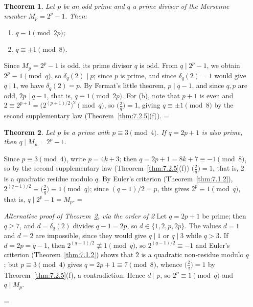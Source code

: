 \documentclass[11pt]{article}
\makeatletter
\let\nt@closedisplay\]
\def\nt@guardedclose{\@ifnextchar\par{\nt@closeafterpar}{\@ifnextchar\end{\postdisplaypenalty\@M\nt@closedisplay}{\nt@closedisplay}}}
\def\nt@closeafterpar\par{\@ifnextchar\par{\nt@closeafterpar}{\@ifnextchar\end{\postdisplaypenalty\@M\nt@closedisplay\par}{\nt@closedisplay\par}}}
\renewenvironment{proof}[1][\proofname]{\par
  \pushQED{\qed}\normalfont\topsep\medskipamount\edef\nt@afterproof{\@endparpenalty=\the\@endparpenalty\relax}\@beginparpenalty\@M\@endparpenalty\@M\let\]\nt@guardedclose\trivlist\item[]\textit{#1\@addpunct{.}} \ignorespaces}{\ifvmode\addpenalty\@M\fi\popQED\nt@afterproof\endtrivlist\@endpefalse}
\theoremstyle{ntstyle}
\newtheorem{theorem}{Theorem}[subsection]
\newenvironment{altproof}[1][\proofname]
  {\begin{proof}[#1]\renewcommand{\qedsymbol}{}}{\end{proof}}
\newcommand{\legs}[2]{\bigl(\tfrac{#1}{#2}\bigr)}
\makeatother
\begin{document}
\begin{theorem}\label{thm:9.2.1} Let $p$ be an odd prime and $q$ a
  prime divisor of the Mersenne number $M_p = 2^p - 1$. Then:
  \begin{enumerate}[label={\alph*)}]
    \item $q\equiv 1 \pmod{2p}$;
    \item $q \equiv \pm 1 \pmod{8}$.
  \end{enumerate}

\end{theorem}

\begin{proof} Since $M_p = 2^{p} - 1$ is odd, its prime
  divisor $q$ is odd. From $q \mid 2^p - 1$, we obtain $2^p \equiv 1 \pmod{q}$, so $\delta_q(2) \mid p$; since $p$
  is prime, and since
  $\delta_q(2) = 1$ would give $q \mid 1$, we have
  $\delta_q(2) = p$. By Fermat's little theorem, $p \mid q - 1$, and since
  $q, p$ are odd, $2p \mid q - 1$, that is, $q \equiv 1 \pmod{2p}$. For
  (b), note that $p+1$ is even and $2 \equiv 2^{p+1} = \big(2^{(p+1)/2}\big)^2 \pmod{q}$, so $\legs{2}{q} = 1$,
  giving $q \equiv \pm 1 \pmod{8}$ by the second supplementary law (Theorem~\ref{thm:7.2.5}(f)).
\end{proof}

\begin{theorem}\label{thm:9.2.2}
  Let $p$ be a prime with $p \equiv 3 \pmod{4}$. If $q = 2p + 1$ is also prime, then $q \mid M_p = 2^{p} - 1$.

\end{theorem}

\begin{proof} Since $p \equiv 3 \pmod{4}$, write $p = 4k + 3$; then $q = 2p + 1 = 8k + 7 \equiv -1 \pmod{8}$, so by the second
  supplementary law (Theorem~\ref{thm:7.2.5}(f)) $\legs{2}{q} = 1$, that is, $2$ is a
  quadratic residue modulo $q$. By Euler's criterion (Theorem~\ref{thm:7.1.2}),
  $2^{(q-1)/2} \equiv \legs{2}{q} \equiv 1 \pmod{q}$; since
  $(q-1)/2 = p$, this gives $2^{p} \equiv 1 \pmod{q}$, that is, $q \mid 2^{p} - 1 = M_p$.
\end{proof}

\begin{altproof}[Alternative proof of Theorem~\ref{thm:9.2.2}, via the order of 2]
  Let $q=2p+1$ be prime; then $q\ge7$, and $d=\delta_q(2)$ divides
  $q-1=2p$, so $d\in\{1,2,p,2p\}$. The values $d=1$ and $d=2$ are
  impossible, since they would give $q\mid1$ or $q\mid3$ while $q>3$. If
  $d=2p=q-1$, then $2^{(q-1)/2}\not\equiv1\pmod{q}$, so
  $2^{(q-1)/2}\equiv-1$ and Euler's criterion (Theorem~\ref{thm:7.1.2}) shows that $2$ is
  a quadratic non-residue modulo $q$; but $p\equiv3\pmod{4}$ gives
  $q=2p+1\equiv7\pmod{8}$, whence $\legs{2}{q}=1$ by Theorem~\ref{thm:7.2.5}(f),
  a contradiction. Hence $d\mid p$, so $2^{p}\equiv1\pmod{q}$
  and $q\mid M_p$.

\end{altproof}
\end{document}
